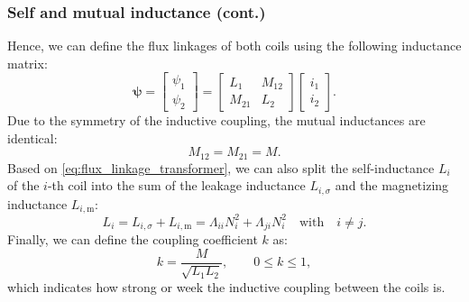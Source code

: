\begin{frame}
	\frametitle{Self and mutual inductance (cont.)}
    Hence, we can define the flux linkages of both coils using the following inductance matrix:
    \begin{equation}
        \bm{\psi} = \begin{bmatrix} \psi_1 \\ \psi_2 \end{bmatrix} = \begin{bmatrix} L_1 & M_{12} \\ M_{21} & L_2 \end{bmatrix} \begin{bmatrix} i_1 \\ i_2 \end{bmatrix}.
    \end{equation}
    \pause
    Due to the symmetry of the inductive coupling, the mutual inductances are identical:
    \begin{equation}
        M_{12} = M_{21} = M.
    \end{equation}
    \pause
    Based on \eqref{eq:flux_linkage_transformer}, we can also split the self-inductance $L_i$ of the $i$-th coil into the sum of the leakage inductance $L_{i,\sigma}$ and the magnetizing inductance $L_{i,\mathrm{m}}$:
    \begin{equation}
        L_i = L_{i,\sigma} + L_{i,\mathrm{m}} = \Lambda_{ii}N_i^2 + \Lambda_{ji}N_i^2 \quad \mbox{with} \quad i \neq j. 
    \end{equation}
    \pause
    Finally, we can define the coupling coefficient $k$ as:
    \begin{equation}
        k = \frac{M}{\sqrt{L_1 L_2}}, \qquad 0 \leq k \leq 1,
    \end{equation}
    which indicates how strong or week the inductive coupling between the coils is.
\end{frame}

